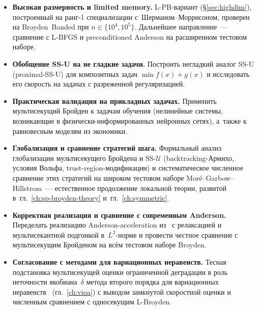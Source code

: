\begin{itemize}[leftmargin=*]
  \item \textbf{Высокая размерность и limited memory.}
        L-PB-вариант (\S\ref{sec:highdim}), построенный на
        ранг-1 специализации с~Шерманом--Моррисоном, проверен на
        Broyden~Banded при $n\in\{10^4, 10^5\}$. Дальнейшее
        направление~--- сравнение с L-BFGS и preconditioned Anderson
        на расширенном тестовом наборе.
  \item \textbf{Обобщение SS-U на не гладкие задачи.}
        Построить негладкий аналог SS-U (proximal-SS-U) для
        композитных задач $\min f(x) + g(x)$ и исследовать его
        скорость на задачах с разреженной регуляризацией.
  \item \textbf{Практическая валидация на прикладных задачах.}
        Применить мультисекущий Бройден к задачам
        обучения (нелинейные системы, возникающие в
        физически-информированных нейронных сетях), а~также к
        равновесным моделям из экономики.
  \item \textbf{Глобализация и сравнение стратегий шага.}
        Формальный анализ глобализации мультисекущего Бройдена и
        SS-$\mathcal{U}$ (backtracking-Армихо, условия Вольфа,
        trust-region-модификации) и систематическое численное
        сравнение этих стратегий на широком тестовом наборе
        Mor\'e--Garbow--Hillstrom~--- естественное продолжение
        локальной теории, развитой в~гл.~\ref{ch:sp-broyden-theory}
        и~гл.~\ref{ch:symmetric}.
  \item \textbf{Корректная реализация и сравнение с современным Anderson.}
        Переделать реализацию Anderson-acceleration из~\cite{walker2011}
        с релаксацией и мультисекантной подгонкой в~$L^2$-норме и
        провести честное сравнение с мультисекущим Бройденом на всём
        тестовом наборе Broyden.
  \item \textbf{Согласование с методами для вариационных неравенств.}
        Тесная подстановка мультисекущей оценки ограниченной деградации
        в роль неточности якобиана~$\delta$ метода второго порядка для
        вариационных неравенств~\cite{viqa2024} (гл.~\ref{ch:viqa})
        с выводом замкнутой скоростной оценки и численным сравнением с
        односекущим L-Broyden.
\end{itemize}
